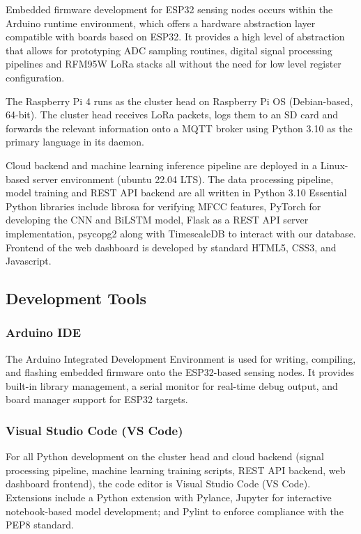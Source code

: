 \documentclass[12pt,a4paper,oneside]{memoir}
\begin{document}
Embedded firmware development for ESP32 sensing nodes occurs within the Arduino runtime environment, which offers a hardware abstraction layer compatible with boards based on ESP32. It provides a high level of abstraction that allows for prototyping ADC sampling routines, digital signal processing pipelines and RFM95W LoRa stacks all without the need for low level register configuration.

The Raspberry Pi 4 runs as the cluster head on Raspberry Pi OS (Debian-based, 64-bit). The cluster head receives LoRa packets, logs them to an SD card and forwards the relevant information onto a MQTT broker using Python 3.10 as the primary language in its daemon.

Cloud backend and machine learning inference pipeline are deployed in a Linux-based server environment (ubuntu 22.04 LTS). The data processing pipeline, model training and REST API backend are all written in Python 3.10 Essential Python libraries include librosa for verifying MFCC features, PyTorch for developing the CNN and BiLSTM model, Flask as a REST API server implementation, psycopg2 along with TimescaleDB to interact with our database. Frontend of the web dashboard is developed by standard HTML5, CSS3, and Javascript.

\subsection{Development Tools}
\label{sec:dev_tools}

\subsubsection{Arduino IDE}

The Arduino Integrated Development Environment is used for writing, compiling, and flashing embedded firmware onto the ESP32-based sensing nodes. It provides built-in library management, a serial monitor for real-time debug output, and board manager support for ESP32 targets.

\subsubsection{Visual Studio Code (VS Code)}

For all Python development on the cluster head and cloud backend (signal processing pipeline, machine learning training scripts, REST API backend, web dashboard frontend), the code editor is Visual Studio Code (VS Code). Extensions include a Python extension with Pylance, Jupyter for interactive notebook-based model development; and Pylint to enforce compliance with the PEP8 standard.
\end{document}
